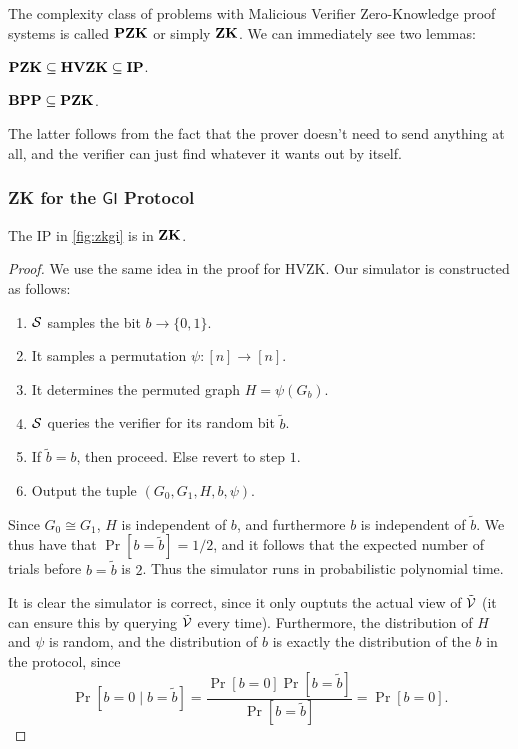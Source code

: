 The complexity class of problems with Malicious Verifier Zero-Knowledge proof systems is called $\mathbf{PZK}$ or simply $\mathbf{ZK}$. We can immediately see two lemmas:

\begin{lemma}
	$\mathbf{PZK}\subseteq\mathbf{HVZK}\subseteq\mathbf{IP}$.
\end{lemma}
\begin{lemma}
	$\mathbf{BPP}\subseteq\mathbf{PZK}$.
\end{lemma}

The latter follows from the fact that the prover doesn't need to send anything at all, and the verifier can just find whatever it wants out by itself.

\subsubsection{ZK for the $\mathsf{GI}$ Protocol}

\begin{theorem}
	The IP in \ref{fig:zkgi} is in $\mathbf{ZK}$.
\end{theorem}

\begin{proof}
	We use the same idea in the proof for HVZK. Our simulator is constructed as follows:
	\begin{enumerate}
		\item $\mathcal{S}$ samples the bit $b\rightarrow\{0,1\}$.
		\item It samples a permutation $\psi:[n]\rightarrow[n]$.
		\item It determines the permuted graph $H=\psi(G_b)$.
		\item $\mathcal{S}$ queries the verifier for its random bit $\tilde{b}$.
		\item If $\tilde{b}=b$, then proceed. Else revert to step $1$.
		\item Output the tuple $(G_0, G_1, H, b, \psi)$.
	\end{enumerate}
	Since $G_0\cong G_1$, $H$ is independent of $b$, and furthermore $b$ is independent of $\tilde{b}$. We thus have that $\Pr[b=\tilde{b}]=1/2$, and it follows that the expected number of trials before $b=\tilde{b}$ is $2$. Thus the simulator runs in probabilistic polynomial time.
	
	It is clear the simulator is correct, since it only ouptuts the actual view of $\tilde{\mathcal{V}}$ (it can ensure this by querying $\tilde{\mathcal{V}}$ every time). Furthermore, the distribution of $H$ and $\psi$ is random, and the distribution of $b$ is exactly the distribution of the $b$ in the protocol, since 
	$$\Pr\left[b=0\mid b=\tilde{b}\right]=\frac{\Pr\left[b=0\right]\Pr\left[b=\tilde{b}\right]}{\Pr\left[b=\tilde{b}\right]}=\Pr\left[b=0\right].$$
\end{proof}

